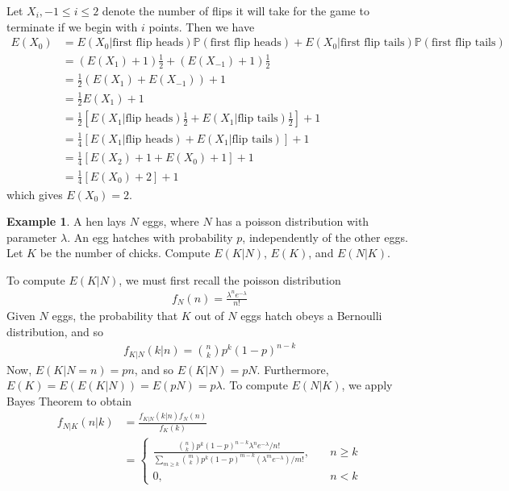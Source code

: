 \documentclass[12pt]{article}
\newcommand{\prob}{\mathbb{P}}
\theoremstyle{plain}
\theoremstyle{definition}
\newtheorem*{example}{Example}
\theoremstyle{remark}
\numberwithin{equation}{section}  %
\begin{document}
Let $X_i, -1 \le i \le 2$ denote the number of flips it will take for the game
to terminate if we begin with $i$ points. Then we have
\begin{align*}
    E(X_0) & = E(X_0 | \text{first flip heads})\prob(\text{first flip heads}) +
    E(X_0 | \text{first flip tails}) \prob(\text{first flip tails})
    \\
    & = (E(X_1) + 1) \frac{1}{2} + (E(X_{-1}) + 1) \frac{1}{2}
    \\
    & = \frac{1}{2}(E(X_1) + E(X_{-1})) + 1
    \\
    & = \frac{1}{2}E(X_1) + 1
    \\
    & = \frac{1}{2}[E(X_1 | \text{flip heads}) \frac{1}{2} + E(X_1 | \text{flip
    tails}) \frac{1}{2}] + 1
    \\
    & = \frac{1}{4}[E(X_1 | \text{flip heads}) + E(X_1 | \text{flip
    tails})] + 1
    \\
    & = \frac{1}{4} [ E(X_2) + 1  + E(X_0) + 1] + 1
    \\
    & = \frac{1}{4}[ E(X_0) + 2] + 1
\end{align*}
which gives $E(X_0) = 2$.
\begin{example}
    A hen lays $N$ eggs, where $N$ has a poisson distribution with parameter
    $\lambda$. An egg hatches with probability $p$, independently  of the other
    eggs. Let $K$ be the number of chicks. Compute $E(K|N)$, $E(K)$, and $E(N | K)$.
\end{example}
To compute $E(K|N)$, we must first recall the poisson distribution
\begin{align*}
    f_N(n) = \frac{\lambda^n e^{-\lambda}}{n!}
\end{align*}
Given $N$ eggs, the probability that $K$ out of $N$ eggs hatch obeys a 
Bernoulli distribution, and so 
\begin{align*}
    f_{K|N}(k|n) = \binom{n}{k} p^k {(1-p)}^{n-k}
\end{align*}
Now, $E(K | N = n) = pn$, and so $E(K | N) = pN$. Furthermore, $E(K) = E(E(K
| N	)) = E(pN) = p \lambda$.
To compute $E(N | K)$, we apply Bayes Theorem to obtain
\begin{align*}
    f_{N|K}(n|k) & = \frac{f_{K|N}(k|n)f_N(n)}{f_K(k)}
    \\
    & = \begin{cases}
        \frac{\binom{n}{k}p^k {(1-p)}^{n-k} \lambda^n
            e^{-\lambda}/n!}{\sum_{m \ge k}
        \binom{m}{k} p^k {(1 - p)}^{m-k} (\lambda^m e^{-\lambda})/m!}
        , \quad & n \ge k
        \\
        0, \quad & n<k
    \end{cases}
\end{align*}
\end{document}
